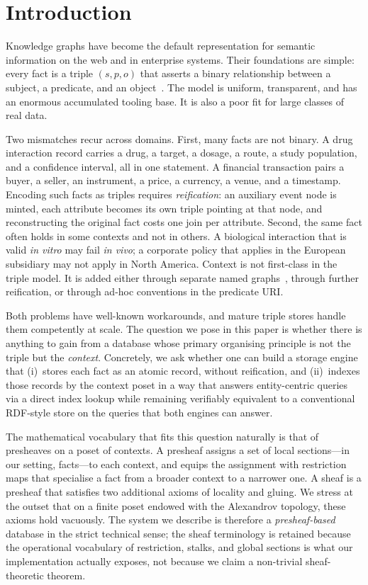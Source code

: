 \section{Introduction}
\label{sec:introduction}

Knowledge graphs have become the default representation for semantic
information on the web and in enterprise systems. Their foundations are simple:
every fact is a triple $(s, p, o)$ that asserts a binary relationship
between a subject, a predicate, and an object~\cite{manola2004rdf,sparql2013}. The
model is uniform, transparent, and has an enormous accumulated tooling base. It
is also a poor fit for large classes of real data.

Two mismatches recur across domains. First, many facts are not binary. A drug
interaction record carries a drug, a target, a dosage, a route, a study population,
and a confidence interval, all in one statement. A financial transaction pairs
a buyer, a seller, an instrument, a price, a currency, a venue, and a
timestamp. Encoding such facts as triples requires \emph{reification}: an
auxiliary event node is minted, each attribute becomes its own triple pointing
at that node, and reconstructing the original fact costs one join per attribute.
Second, the same fact often holds in some contexts and not in others. A
biological interaction that is valid \emph{in vitro} may fail \emph{in vivo};
a corporate policy that applies in the European subsidiary may not apply in
North America. Context is not first-class in the triple model. It is added
either through separate named graphs~\cite{carroll2005named}, through further
reification, or through ad-hoc conventions in the predicate URI.

Both problems have well-known workarounds, and mature triple stores handle
them competently at scale. The question we pose in this paper is whether there
is anything to gain from a database whose primary organising principle is not
the triple but the \emph{context}. Concretely, we ask whether one can build a
storage engine that (i)~stores each fact as an atomic record, without
reification, and (ii)~indexes those records by the context poset in a way that
answers entity-centric queries via a direct index lookup while remaining verifiably
equivalent to a conventional RDF-style store on the queries that both engines
can answer.

The mathematical vocabulary that fits this question naturally is that of
presheaves on a poset of contexts. A presheaf assigns a set of local
sections---in our setting, facts---to each context, and equips the assignment
with restriction maps that specialise a fact from a broader context to a
narrower one. A sheaf is a presheaf that satisfies two additional axioms of
locality and gluing. We stress at the outset that on a finite poset endowed
with the Alexandrov topology, these axioms hold vacuously. The system we describe
is therefore a \emph{presheaf-based} database in the strict technical sense; the
sheaf terminology is retained because the operational vocabulary of restriction,
stalks, and global sections is what our implementation actually exposes, not
because we claim a non-trivial sheaf-theoretic theorem.

